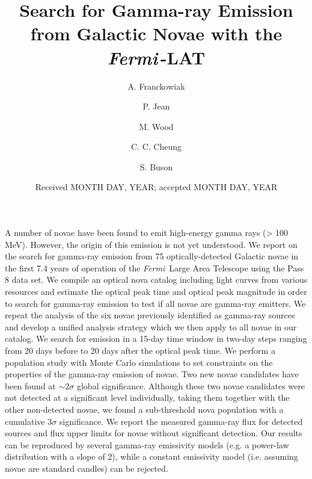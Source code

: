 \documentclass{aa} %
\newcommand{\Fermi}{\textit{Fermi}}
\begin{document}
\title{Search for Gamma-ray Emission from Galactic Novae with the \Fermi\,-LAT}



   \author{A. Franckowiak
          \and
          P. Jean
          \and          
          M. Wood
          \and
          C. C. Cheung
          \and
          S. Buson
          }


\date{Received MONTH DAY, YEAR; accepted MONTH DAY, YEAR}


  \abstract
   {A number of novae have been found to emit high-energy gamma rays (> 100 MeV). However, the origin of this emission is not yet understood. We report on the search for gamma-ray emission from 75 optically-detected Galactic novae in the first 7.4 years of operation of the  \Fermi\, Large Area Telescope using the Pass 8 data set.}
   {We compile an optical nova catalog including light curves from various resources and estimate the optical peak time and optical peak magnitude in order to search for gamma-ray emission to test if all novae are gamma-ray emitters.}
   {We repeat the analysis of the six novae previously identified as gamma-ray sources and develop a unified analysis strategy which we then apply to all novae in our catalog. We search for emission in a 15-day time window in two-day steps ranging from 20 days before to 20 days after the optical peak time. We perform a population study with Monte Carlo simulations to set constraints on the properties of the gamma-ray emission of novae.}
   {Two new novae candidates have been found at $\sim2\sigma$ global significance. Although these two novae candidates were not detected at a significant level individually, taking them together with the other non-detected novae, we found a sub-threshold nova population with a cumulative $3\sigma$ significance. We report the measured gamma-ray flux for detected sources and flux upper limits for novae without significant detection. Our results can be reproduced by several gamma-ray emissivity models (e.g. a power-law distribution with a slope of 2), while a constant emissivity model (i.e. assuming novae are standard candles) can be rejected.}
   {}
\end{document}

